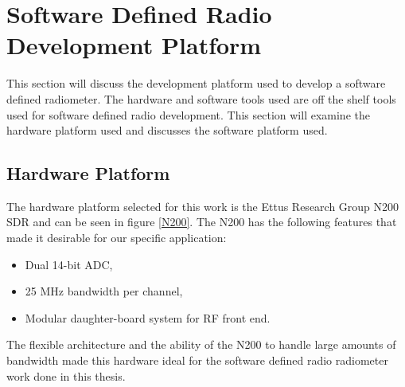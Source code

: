 
\section{Software Defined Radio Development Platform} \label{SDR_platform}
This section will discuss the development platform used to develop a software defined radiometer.  The hardware and software tools used are off the shelf tools used for software defined radio development.  This section will examine the hardware platform used and discusses the software platform used.  


\subsection{Hardware Platform}
The hardware platform selected for this work is the Ettus Research Group N200 SDR and can be seen in figure \ref{N200}.  The N200 has the following features that made it desirable for our specific application:

\begin{itemize}
\item Dual 14-bit ADC,
\item 25 MHz bandwidth per channel,
\item Modular daughter-board system for RF front end.
\end{itemize}

The flexible architecture and the ability of the N200 to handle large amounts of bandwidth made this hardware ideal for the software defined radio radiometer work done in this thesis.

